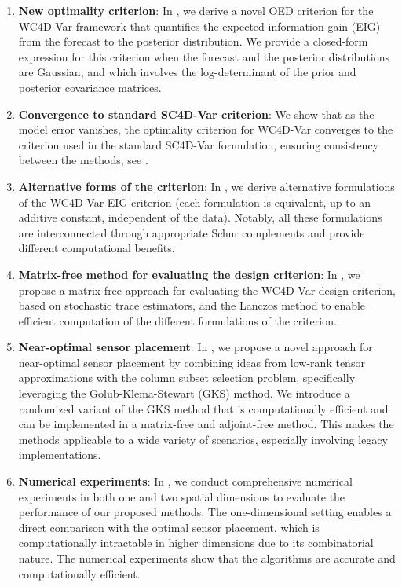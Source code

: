\documentclass{aims} %
\theoremstyle{definition}
\begin{document}
\begin{enumerate}
    \item {\bf New optimality criterion}: In  , we derive a novel OED criterion for the WC4D-Var framework that quantifies the expected information gain (EIG) from the forecast to the posterior distribution. We provide a closed-form expression for this criterion when the forecast and the posterior distributions are Gaussian, and which involves the log-determinant of the  prior and posterior covariance matrices.
    \item {\bf Convergence to standard SC4D-Var criterion}:
    We show that as the model  error vanishes, the optimality criterion for WC4D-Var converges to the criterion used in the standard SC4D-Var formulation, ensuring consistency between the methods, see .
    
    \item {\bf Alternative forms of the criterion}: 
    In  ,  we derive alternative formulations of the WC4D-Var EIG criterion (each formulation is equivalent, up to an additive constant, independent of the data). Notably, all these formulations are interconnected through appropriate Schur complements and provide different computational benefits.
%   
    \item{\bf Matrix-free method for evaluating the design criterion}:
    In , 
    we propose a matrix-free approach for evaluating the WC4D-Var design criterion, based on stochastic trace estimators, and the Lanczos method to enable efficient computation of the different formulations of the criterion.


    \item {\bf Near-optimal sensor placement}: In , we propose a novel approach for near-optimal sensor placement by combining ideas from low-rank tensor approximations with the column subset selection problem, specifically leveraging the Golub-Klema-Stewart (GKS) method.  We introduce a randomized variant of the GKS method that is computationally efficient and can be implemented in a matrix-free and adjoint-free method. This makes the methods applicable to a wide variety of scenarios, especially involving legacy implementations. 
    

    \item {\bf Numerical experiments}: In , we conduct comprehensive numerical experiments in both one and two spatial dimensions to evaluate the performance of our proposed methods. The one-dimensional setting enables a direct comparison with the optimal sensor placement, which is computationally intractable in higher dimensions due to its combinatorial nature. The numerical experiments show that the algorithms are accurate and computationally efficient.


\end{enumerate}
\end{document}
